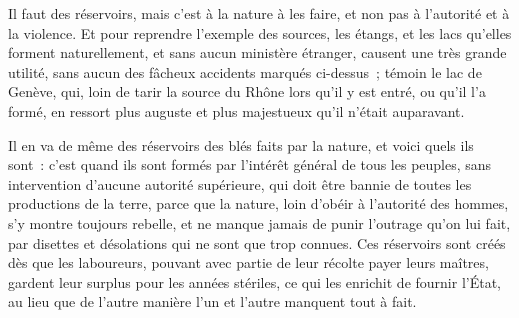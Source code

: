 \documentclass[french,twoside]{book} %
\begin{document}
Il faut des réservoirs, mais c’est à la nature à les faire, et non pas à l’autorité et à la violence. Et pour reprendre l’exemple des sources, les étangs, et les lacs qu’elles forment naturellement, et sans aucun ministère étranger, causent une très grande utilité, sans aucun des fâcheux accidents marqués ci-dessus ; témoin le lac de Genève, qui, loin de tarir la source du Rhône lors qu’il y est entré, ou qu’il l’a formé, en ressort plus auguste et plus majestueux qu’il n’était auparavant.\par
Il en va de même des réservoirs des blés faits par la nature, et voici quels ils sont : c’est quand ils sont formés par l’intérêt général de tous les peuples, sans intervention d’aucune autorité supérieure, qui doit être bannie de toutes les productions de la terre, parce que la nature, loin d’obéir à l’autorité des hommes, s’y montre toujours rebelle, et ne manque jamais de punir l’outrage qu’on lui fait, par disettes et désolations qui ne sont que trop connues. Ces réservoirs sont créés dès que les laboureurs, pouvant avec partie de leur récolte payer leurs maîtres, gardent leur surplus pour les années stériles, ce qui les enrichit de fournir l’État, au lieu que de l’autre manière l’un et l’autre manquent tout à fait.
\end{document}
